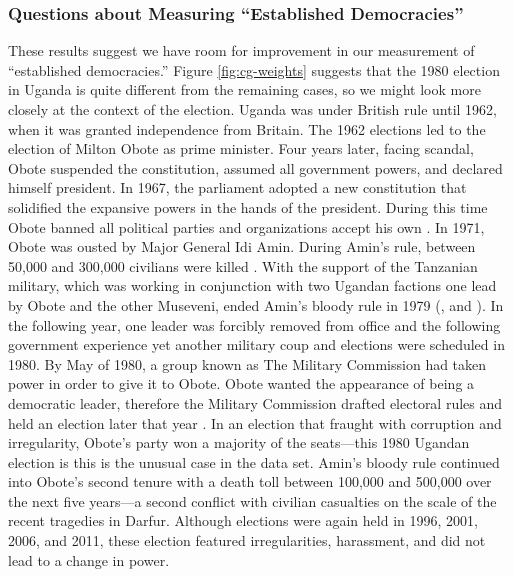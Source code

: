 \documentclass[12pt]{article}
\begin{document}
\subsubsection*{Questions about Measuring ``Established Democracies''}

These results suggest we have room for improvement in our measurement of ``established democracies.'' 
Figure \ref{fig:cg-weights} suggests that the 1980 election in Uganda is quite different from the remaining cases, so we might look more closely at the context of the election.
Uganda was under British rule until 1962, when it was granted independence from Britain. 
The 1962 elections led to the election of Milton Obote as prime minister. 
Four years later, facing scandal, Obote suspended the constitution, assumed all government powers, and declared himself president. 
In 1967, the parliament adopted a new constitution that solidified the expansive powers in the hands of the president. 
During this time Obote banned all political parties and organizations accept his own \citep[p. 99]{Kasozi1993}. 
In 1971, Obote was ousted by Major General Idi Amin. During Amin's rule, between 50,000 and 300,000 civilians were killed \citep[p. 104]{Kasozi1993}. 
With the support of the Tanzanian military, which was working in conjunction with two Ugandan factions one lead by Obote and the other Museveni, ended Amin's bloody rule in 1979 (\citealt[p. 53]{Kasfir1998}, and \citealt[pp. 124-127]{Kasozi1993}).
In the following year, one leader was forcibly removed from office and the following government experience yet another military coup and elections were scheduled in 1980. 
By May of 1980, a group known as The Military Commission had taken power in order to give it to Obote. 
Obote wanted the appearance of being a democratic leader, therefore the Military Commission drafted electoral rules and held an election later that year \citep[pp. 135-137]{Kasozi1993}.
In an election that fraught with corruption and irregularity, Obote's party won a majority of the seats---this 1980 Ugandan election is this is the unusual case in the data set.
Amin's bloody rule continued into Obote's second tenure with a death toll between 100,000 and 500,000 over the next five years---a second conflict with civilian casualties on the scale of the recent tragedies in Darfur. 
Although elections were again held in 1996, 2001, 2006, and 2011, these election featured irregularities, harassment, and did not lead to a change in power.
\end{document}

